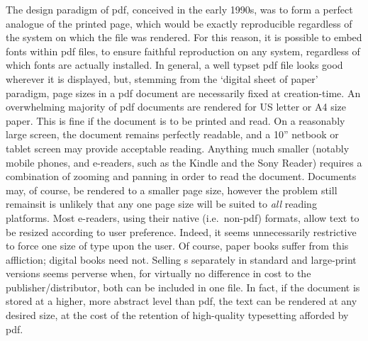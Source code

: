 The design paradigm of \gls{pdf}, conceived in the early 1990s\cite{Warnock1991}, was to form a perfect
analogue of the printed page, which would be exactly reproducible regardless of the system on which
the file was rendered. For this reason, it is possible to embed fonts within \gls{pdf} files, to ensure
faithful reproduction on any system, regardless of which fonts are actually installed. In general, a
well typset \gls{pdf} file looks good wherever it is displayed, but, stemming from the `digital sheet
of paper' paradigm, page sizes in a \gls{pdf} document are necessarily fixed at creation-time. An
overwhelming majority of \gls{pdf} documents are rendered for  US letter or A4 size paper. This is fine
if the document is to be printed and read. On a reasonably large screen, the document remains
perfectly readable, and a 10'' netbook or tablet screen may provide acceptable reading. Anything much
smaller (notably mobile phones, and e-readers, such as the Kindle and the Sony Reader) requires
a combination of zooming and panning 
in order to read the document. Documents may, of course, be rendered to a smaller page size, however
the problem still remains\ed it is unlikely that any one page size will be suited to \emph{all}
reading platforms. Most e-readers, using their native (i.e.\ non-\gls{pdf}) formats, allow text to be
resized according to user preference. Indeed, it seems unnecessarily restrictive to force one size
of type upon the user. Of course, paper books suffer from this affliction; digital books need not.
Selling \ebook{}s separately in standard and large-print versions seems perverse when, for virtually
no difference in cost to the publisher/distributor, both can be included in one file. In fact,
if the document is stored at a higher, more abstract level than \gls{pdf}, the text can be rendered
at any desired size, at the cost of the retention of high-quality typesetting afforded by \gls{pdf}.


